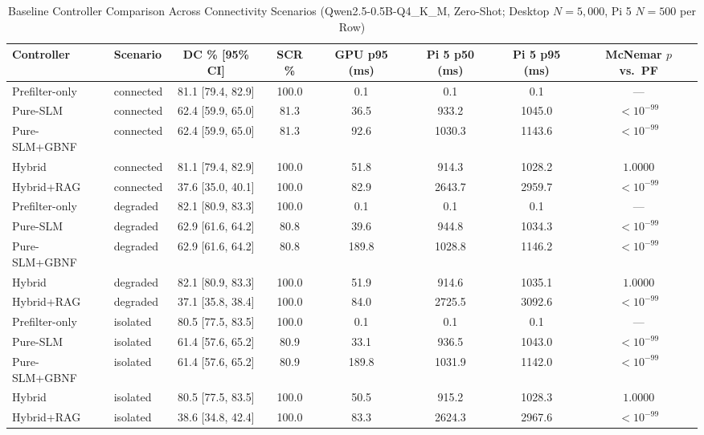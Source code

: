 \begin{table}[t]
\centering
\caption{Baseline Controller Comparison Across Connectivity Scenarios (Qwen2.5-0.5B-Q4\_K\_M, Zero-Shot; Desktop $N=5{,}000$, Pi 5 $N=500$ per Row)}
\label{tab:exp1_main}
\begin{tabular}{llcccccc}
\toprule
\textbf{Controller} & \textbf{Scenario} & \textbf{DC \% [95\% CI]} & \textbf{SCR \%} & \textbf{GPU p95 (ms)} & \textbf{Pi 5 p50 (ms)} & \textbf{Pi 5 p95 (ms)} & \textbf{McNemar $p$ vs.\ PF} \\
\midrule
Prefilter-only & connected & 81.1 [79.4, 82.9] & 100.0 & 0.1 & 0.1 & 0.1 & --- \\
Pure-SLM & connected & 62.4 [59.9, 65.0] & 81.3 & 36.5 & 933.2 & 1045.0 & $< 10^{-99}$ \\
Pure-SLM+GBNF & connected & 62.4 [59.9, 65.0] & 81.3 & 92.6 & 1030.3 & 1143.6 & $< 10^{-99}$ \\
Hybrid & connected & 81.1 [79.4, 82.9] & 100.0 & 51.8 & 914.3 & 1028.2 & $1.0000$ \\
Hybrid+RAG & connected & 37.6 [35.0, 40.1] & 100.0 & 82.9 & 2643.7 & 2959.7 & $< 10^{-99}$ \\
\midrule
Prefilter-only & degraded & 82.1 [80.9, 83.3] & 100.0 & 0.1 & 0.1 & 0.1 & --- \\
Pure-SLM & degraded & 62.9 [61.6, 64.2] & 80.8 & 39.6 & 944.8 & 1034.3 & $< 10^{-99}$ \\
Pure-SLM+GBNF & degraded & 62.9 [61.6, 64.2] & 80.8 & 189.8 & 1028.8 & 1146.2 & $< 10^{-99}$ \\
Hybrid & degraded & 82.1 [80.9, 83.3] & 100.0 & 51.9 & 914.6 & 1035.1 & $1.0000$ \\
Hybrid+RAG & degraded & 37.1 [35.8, 38.4] & 100.0 & 84.0 & 2725.5 & 3092.6 & $< 10^{-99}$ \\
\midrule
Prefilter-only & isolated & 80.5 [77.5, 83.5] & 100.0 & 0.1 & 0.1 & 0.1 & --- \\
Pure-SLM & isolated & 61.4 [57.6, 65.2] & 80.9 & 33.1 & 936.5 & 1043.0 & $< 10^{-99}$ \\
Pure-SLM+GBNF & isolated & 61.4 [57.6, 65.2] & 80.9 & 189.8 & 1031.9 & 1142.0 & $< 10^{-99}$ \\
Hybrid & isolated & 80.5 [77.5, 83.5] & 100.0 & 50.5 & 915.2 & 1028.3 & $1.0000$ \\
Hybrid+RAG & isolated & 38.6 [34.8, 42.4] & 100.0 & 83.3 & 2624.3 & 2967.6 & $< 10^{-99}$ \\
\bottomrule
\end{tabular}
\end{table}
